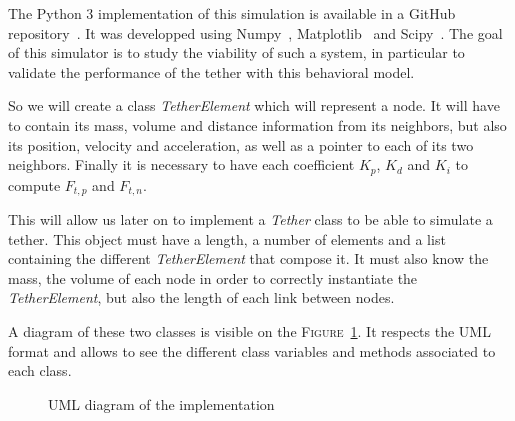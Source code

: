 The Python 3 implementation of this simulation is available in a GitHub repository~\cite{teusner_teusnertether_modeling_2021}. It was developped using Numpy~\cite{noauthor_numpy_nodate}, Matplotlib~\cite{noauthor_matplotlib_nodate} and Scipy~\cite{noauthor_scipyorg_nodate}. The goal of this simulator is to study the viability of such a system, in particular to validate the performance of the tether with this behavioral model.

So we will create a class \textit{TetherElement} which will represent a node. It will have to contain its mass, volume and distance information from its neighbors, but also its position, velocity and acceleration, as well as a pointer to each of its two neighbors. Finally it is necessary to have each coefficient $K_p$, $K_d$ and $K_i$ to compute $F_{t, p}$ and $F_{t, n}$.

This will allow us later on to implement a \textit{Tether} class to be able to simulate a tether. This object must have a length, a number of elements and a list containing the different \textit{TetherElement} that compose it. It must also know the mass, the volume of each node in order to correctly instantiate the \textit{TetherElement}, but also the length of each link between nodes.

A diagram of these two classes is visible on the \textsc{Figure}~\ref{fig:uml}. It respects the \textsc{UML} format and allows to see the different class variables and methods associated to each class.

\begin{figure}
    \centering
    \caption{UML diagram of the implementation}
    \label{fig:uml}
\end{figure}
